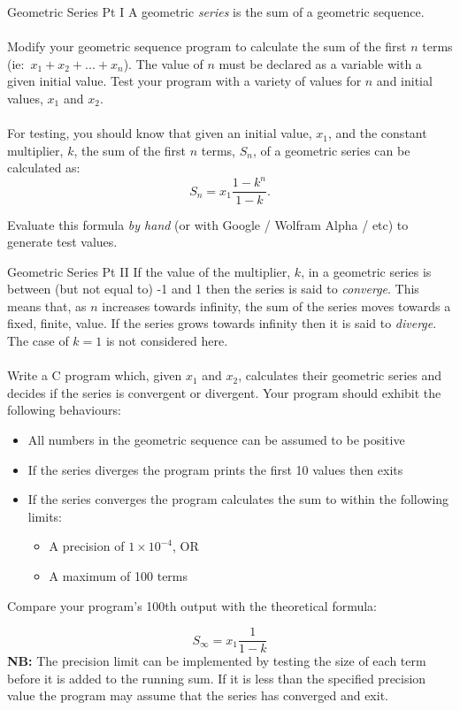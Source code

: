 \documentclass{lab}
\begin{document}
\begin{task}{Geometric Series Pt I}{}
A geometric \textit{series} is the sum of a geometric sequence.
\\ \\
Modify your geometric sequence program to calculate the sum of the first $n$ terms (ie:~$x_1+x_2+ ... + x_n$). The value of $n$ must be declared as a variable with a given initial value. Test your program with a variety of values for $n$ and initial values, $x_1$ and $x_2$.
\\ \\
For testing, you should know that given an initial value, $x_1$, and the constant multiplier, $k$, the sum of the first $n$ terms, $S_n$, of a geometric series can be calculated as:
\begin{equation}
S_n = x_1\frac{1-k^{n}}{1-k}.
\end{equation}

Evaluate this formula \textit{by hand} (or with Google / Wolfram Alpha / etc) to generate test values.
\end{task}

\begin{task}{Geometric Series Pt II}{}
If the value of the multiplier, $k$, in a geometric series is between (but not equal to) -1 and 1 then the series is said to \textit{converge}. This means that, as $n$ increases towards infinity, the sum of the series moves towards a fixed, finite, value. If the series grows towards infinity then it is said to \textit{diverge}. The case of $k = 1$ is not considered here.
\\ \\
Write a C program which, given $x_1$ and $x_2$, calculates their geometric series and decides if the series is convergent or divergent. Your program should exhibit the following behaviours: 
\begin{itemize}
\item All numbers in the geometric sequence can be assumed to be positive
\item If the series diverges the program prints the first 10 values then exits
\item If the series converges the program calculates the sum to within the following limits:
	\begin{itemize}
		\item A precision of $1 \times 10^{-4}$, OR
		\item A maximum of 100 terms
	\end{itemize}
\end{itemize}

Compare your program's 100th output with the theoretical formula:

\begin{equation}
S_\infty = x_1 \frac{1}{1-k}
\end{equation}
\textbf{NB:} The precision limit can be implemented by testing the size of each term before it is added to the running sum. If it is less than the specified precision value the program may assume that the series has converged and exit.
\end{task}
\end{document}
